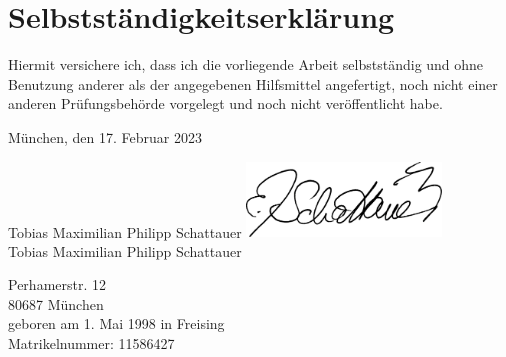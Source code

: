 \chapter*{Selbstständigkeitserklärung}
Hiermit versichere ich, dass ich die vorliegende Arbeit selbstständig und ohne Benutzung anderer als der angegebenen Hilfsmittel angefertigt, noch nicht einer anderen Prüfungsbehörde vorgelegt und noch nicht veröffentlicht habe.

\vspace{5cm}
München, den 17. Februar 2023

\ifprintversion
    \vspace{3cm}
    Tobias Maximilian Philipp Schattauer
\else
    \vspace{1cm}
    \includegraphics[height=2cm]{img/full_a4.png}\\
    Tobias Maximilian Philipp Schattauer
\fi

\ifprintversion
Perhamerstr. 12 \\
80687 München \\
geboren am 1. Mai 1998 in Freising \\
Matrikelnummer: 11586427
\fi